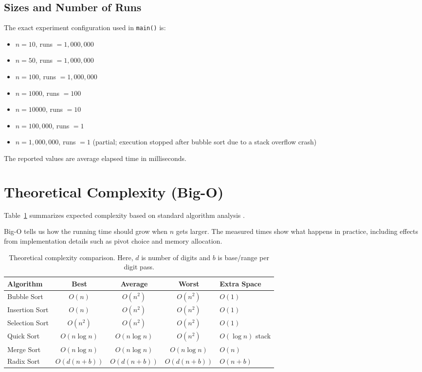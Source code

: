 \documentclass[11pt,a4paper]{article}
\begin{document}
\subsection{Sizes and Number of Runs}
The exact experiment configuration used in \texttt{main()} is:
\begin{itemize}
    \item \(n=10\), runs \(=1{,}000{,}000\)
    \item \(n=50\), runs \(=1{,}000{,}000\)
    \item \(n=100\), runs \(=1{,}000{,}000\)
    \item \(n=1000\), runs \(=100\)
    \item \(n=10000\), runs \(=10\)
    \item \(n=100{,}000\), runs \(=1\)
    \item \(n=1{,}000{,}000\), runs \(=1\) (partial; execution stopped after bubble sort due to a stack overflow crash)
\end{itemize}

The reported values are average elapsed time in milliseconds.

\section{Theoretical Complexity (Big-O)}
Table~\ref{tab:complexity} summarizes expected complexity based on standard algorithm analysis \cite{cormen2009,knuth1998}.

Big-O tells us how the running time should grow when \(n\) gets larger. The measured times show what happens in practice, including effects from implementation details such as pivot choice and memory allocation.

\begin{table}[H]
\centering
\begin{tabular}{>{\raggedright\arraybackslash}p{3cm}ccc>{\raggedright\arraybackslash}p{3cm}}
\toprule
Algorithm & Best & Average & Worst & Extra Space \\
\midrule
Bubble Sort & \(O(n)\) & \(O(n^2)\) & \(O(n^2)\) & \(O(1)\) \\
Insertion Sort & \(O(n)\) & \(O(n^2)\) & \(O(n^2)\) & \(O(1)\) \\
Selection Sort & \(O(n^2)\) & \(O(n^2)\) & \(O(n^2)\) & \(O(1)\) \\
Quick Sort & \(O(n\log n)\) & \(O(n\log n)\) & \(O(n^2)\) & \(O(\log n)\) stack \\
Merge Sort & \(O(n\log n)\) & \(O(n\log n)\) & \(O(n\log n)\) & \(O(n)\) \\
Radix Sort & \(O(d(n+b))\) & \(O(d(n+b))\) & \(O(d(n+b))\) & \(O(n+b)\) \\
\bottomrule
\end{tabular}
\caption{Theoretical complexity comparison. Here, \(d\) is number of digits and \(b\) is base/range per digit pass.}
\label{tab:complexity}
\end{table}
\end{document}
